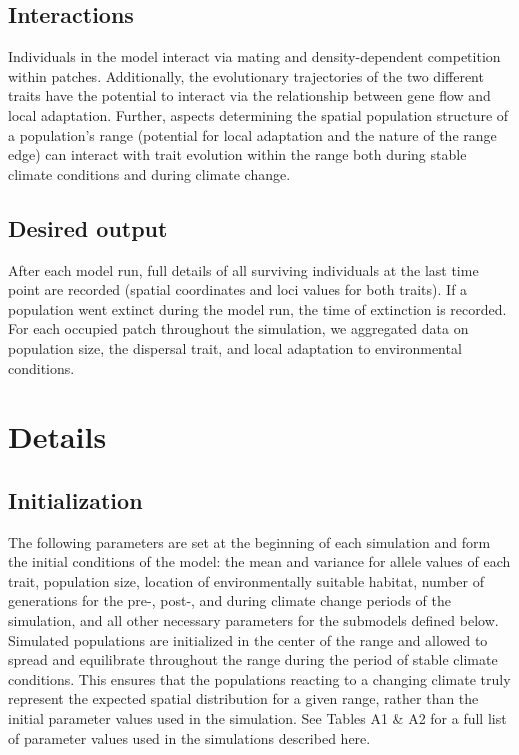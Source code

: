 \documentclass[11pt]{article}
\begin{document}
\subsection*{Interactions} 
Individuals in the model interact via mating and density-dependent competition within patches. Additionally, the evolutionary trajectories of the two different traits have the potential to interact via the relationship between gene flow and local adaptation. Further, aspects determining the spatial population structure of a population's range (potential for local adaptation and the nature of the range edge) can interact with trait evolution within the range both during stable climate conditions and during climate change.

\subsection*{Desired output} 
After each model run, full details of all surviving individuals at the last time point are recorded (spatial coordinates and loci values for both traits). If a population went extinct during the model run, the time of extinction is recorded. For each occupied patch throughout the simulation, we aggregated data on population size, the dispersal trait, and local adaptation to environmental conditions. 

\section*{Details}
\subsection*{Initialization} 
The following parameters are set at the beginning of each simulation and form the initial conditions of the model: the mean and variance for allele values of each trait, population size, location of environmentally suitable habitat, number of generations for the pre-, post-, and during climate change periods of the simulation, and all other necessary parameters for the submodels defined below. Simulated populations are initialized in the center of the range and allowed to spread and equilibrate throughout the range during the period of stable climate conditions. This ensures that the populations reacting to a changing climate truly represent the expected spatial distribution for a given range, rather than the initial parameter values used in the simulation. See Tables A1 \& A2 for a full list of parameter values used in the simulations described here.
\end{document}
